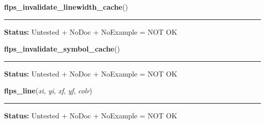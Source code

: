     \label{xformslib:library:flps_invalidate_linewidth_cache}

    \vspace{0.5ex}

\hspace{.8\funcindent}\begin{boxedminipage}{\funcwidth}

    \raggedright \textbf{flps\_invalidate\_linewidth\_cache}()

    \vspace{-1.5ex}

    \rule{\textwidth}{0.5\fboxrule}
\setlength{\parskip}{2ex}
\setlength{\parskip}{1ex}
\textbf{Status:} Untested + NoDoc + NoExample = NOT OK



    \end{boxedminipage}

    \label{xformslib:library:flps_invalidate_symbol_cache}

    \vspace{0.5ex}

\hspace{.8\funcindent}\begin{boxedminipage}{\funcwidth}

    \raggedright \textbf{flps\_invalidate\_symbol\_cache}()

    \vspace{-1.5ex}

    \rule{\textwidth}{0.5\fboxrule}
\setlength{\parskip}{2ex}
\setlength{\parskip}{1ex}
\textbf{Status:} Untested + NoDoc + NoExample = NOT OK



    \end{boxedminipage}

    \label{xformslib:library:flps_line}

    \vspace{0.5ex}

\hspace{.8\funcindent}\begin{boxedminipage}{\funcwidth}

    \raggedright \textbf{flps\_line}(\textit{xi}, \textit{yi}, \textit{xf}, \textit{yf}, \textit{colr})

    \vspace{-1.5ex}

    \rule{\textwidth}{0.5\fboxrule}
\setlength{\parskip}{2ex}
\setlength{\parskip}{1ex}
\textbf{Status:} Untested + NoDoc + NoExample = NOT OK



    \end{boxedminipage}


